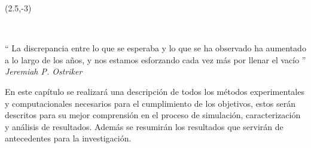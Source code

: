 \begin{textblock}{9}(2.5,-3)
\begin{flushright}
\setlength{\baselineskip}{15pt}
~

`` La discrepancia entre lo que se esperaba y lo que se ha observado ha aumentado a lo largo de los años, y nos estamos esforzando cada vez más por llenar el vacío
''\\[.5cm]
\textit{Jeremiah P. Ostriker}
\end{flushright}
\end{textblock}

En este capítulo se realizará una descripción de todos los métodos experimentales y computacionales necesarios para el cumplimiento de los objetivos, estos serán descritos para su mejor comprensión en el proceso de simulación, caracterización y análisis de resultados. Además se resumirán los resultados que servirán de antecedentes para la investigación.